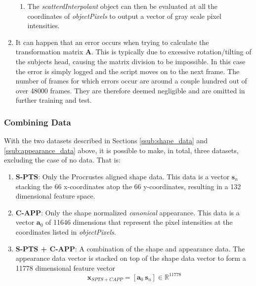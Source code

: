 \documentclass[Main]{subfiles}
\begin{document}
\begin{enumerate}
\begin{enumerate}[label=\Roman*.]
						\item
						The \emph{scatterdInterpolant} object can then be evaluated at all the coordinates of \emph{objectPixels} to output a vector of gray scale pixel intensities.
						
					\end{enumerate}

					\item
					It can happen that an error occurs when trying to calculate the transformation matrix $\textbf{A}$.
					This is typically due to excessive rotation/tilting of the subjects head, causing the matrix division to be impossible.
					In this case the error is simply logged and the script moves on to the next frame.
					The number of frames for which errors occur are around a couple hundred out of over 48000 frames.
					They are therefore deemed negligible and are omitted in further training and test.

				\end{enumerate}

			
		\subsubsection{Combining Data} %
			\label{ssub:combining_data}
			With the two datasets described in Sections \ref{ssub:shape_data} and \ref{ssub:appearance_data} above, it is possible to make, in total, three datasets, excluding the case of no data.
			That is:
			\begin{enumerate}
				\item
				\textbf{S-PTS}: 
				Only the Procrustes aligned shape data.
				This data is a vector $\textbf{s}_n$ stacking the 66 x-coordinates atop the 66 y-coordinates, resulting in a 132 dimensional feature space.

				\item
				\textbf{C-APP}:
				Only the shape normalized \emph{canonical} appearance.
				This data is a vector $\textbf{a}_0$ of 11646 dimensions that represent the pixel intensities at the coordinates listed in \emph{objectPixels}.

				\item
				\textbf{S-PTS + C-APP}:
				A combination of the shape and appearance data.
				The appearance data vector is stacked on top of the shape data vector to form a 11778 dimensional feature vector
				\begin{equation}
					\textbf{x}_{SPTS+CAPP} = 
						[\textbf{a}_0\ \textbf{s}_n] 
						\in \mathbb{R}^{11778}
				\end{equation}

			\end{enumerate}
\end{document}

